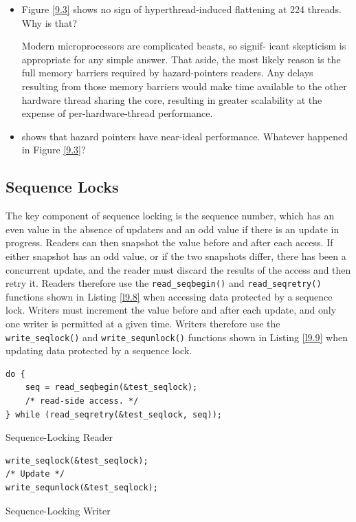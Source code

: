 \documentclass[11pt]{article}
\begin{document}
\begin{remark}[]
\begin{itemize}
\item Figure \ref{9.3} shows no sign of hyperthread-induced flattening at 224 threads. Why is that?

Modern microprocessors are complicated beasts, so signif- icant skepticism is appropriate for any
simple answer. That aside, the most likely reason is the full memory barriers required by
hazard-pointers readers. Any delays resulting from those memory barriers would make time available
to the other hardware thread sharing the core, resulting in greater scalability at the expense of
per-hardware-thread performance.
\item \cite{10.1145/2483852.2483867} shows that hazard pointers have near-ideal performance. Whatever
happened in Figure \ref{9.3}?
\end{itemize}
\end{remark}
\subsection{Sequence Locks}
\label{sec:orgbc237c4}
The key component of sequence locking is the sequence number, which has an even value in the absence
of updaters and an odd value if there is an update in progress. Readers can then snapshot the value
before and after each access. If either snapshot has an odd value, or if the two snapshots differ,
there has been a concurrent update, and the reader must discard the results of the access and then
retry it. Readers therefore use the \texttt{read\_seqbegin()} and \texttt{read\_seqretry()} functions shown in Listing \ref{l9.8}
when accessing data protected by a sequence lock. Writers must increment the value before and after
each update, and only one writer is permitted at a given time. Writers therefore use the
\texttt{write\_seqlock()} and \texttt{write\_sequnlock()} functions shown in Listing \ref{l9.9} when updating data protected
by a sequence lock.

\begin{listing}[htbp]
\begin{verbatim}
do {
    seq = read_seqbegin(&test_seqlock);
    /* read-side access. */
} while (read_seqretry(&test_seqlock, seq));
\end{verbatim}
\caption{\label{l9.8}Sequence-Locking Reader}
\end{listing}

\begin{listing}[htbp]
\begin{verbatim}
write_seqlock(&test_seqlock);
/* Update */
write_sequnlock(&test_seqlock);
\end{verbatim}
\caption{\label{l9.9}Sequence-Locking Writer}
\end{listing}
\end{document}

